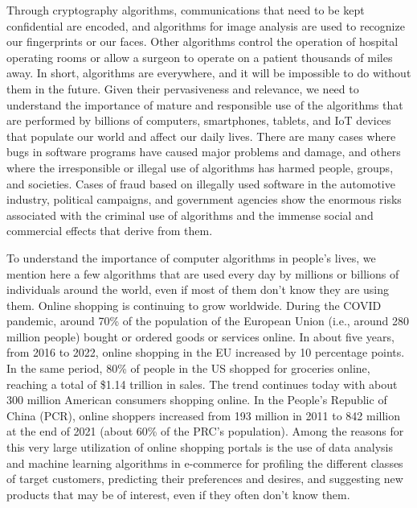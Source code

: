 Through cryptography algorithms, communications that need to be kept confidential are encoded, and algorithms for image analysis are used to recognize our fingerprints or our faces. Other algorithms control the operation of hospital operating rooms or allow a \hbox{surgeon} to operate on a patient thousands of miles away. In short, algorithms are everywhere, and it will be impossible to do without them in the future. Given their pervasiveness and relevance, we need to understand the importance of mature and responsible use of the algorithms that are performed by billions of computers, smartphones, tablets, and IoT devices that populate our world and affect our daily lives. There are many cases where bugs in software programs have caused major problems and damage, and others where the irresponsible or illegal use of algorithms has harmed people, groups, and \hbox{societies.} Cases of fraud based on illegally used software in the automotive industry, political campaigns, and government agencies show the enormous risks associated with the criminal use of algorithms and the immense social and commercial effects that derive from them.

To understand the importance of computer algorithms in people's lives, we mention here a few algorithms that are used every day by millions or billions of individuals around the world, even if most of them don't know they are using them. Online shopping is continuing to grow worldwide. During the COVID pandemic, around 70\% of the population of the European Union (i.e., around 280 million \hbox{people)} bought or ordered goods or services online. In about five years, from 2016 to 2022, online shopping in the EU increased by 10 percentage points. In the same period, 80\% of people in the US shopped for groceries online, reaching a total of \$1.14 trillion in sales. The trend continues today with about 300 million \hbox{American} consumers shopping online. In the People's Republic of China (PCR), online shoppers increased from 193 million in 2011 to 842 million at the end of 2021 (about 60\% of the PRC's population). Among the reasons for this very large utilization of online shopping portals is the use of data analysis and machine learning algorithms in e-commerce for profiling the different classes of target customers, predicting their preferences and desires, and suggesting new products that may be of interest, even if they often don't know them.

